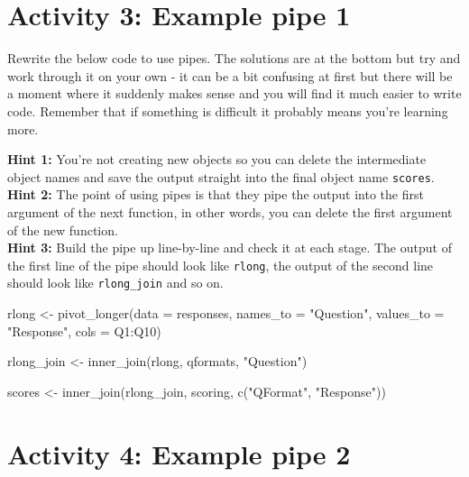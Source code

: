\documentclass[
  oneside]{book}
\newenvironment{Shaded}{\begin{snugshade}}{\end{snugshade}}
\newcommand{\AttributeTok}[1]{\textcolor[rgb]{0.77,0.63,0.00}{#1}}
\newcommand{\FunctionTok}[1]{\textcolor[rgb]{0.00,0.00,0.00}{#1}}
\newcommand{\NormalTok}[1]{#1}
\newcommand{\OtherTok}[1]{\textcolor[rgb]{0.56,0.35,0.01}{#1}}
\newcommand{\SpecialCharTok}[1]{\textcolor[rgb]{0.00,0.00,0.00}{#1}}
\newcommand{\StringTok}[1]{\textcolor[rgb]{0.31,0.60,0.02}{#1}}
\begin{document}
\hypertarget{activity-3-example-pipe-1}{%
\section{Activity 3: Example pipe 1}\label{activity-3-example-pipe-1}}

Rewrite the below code to use pipes. The solutions are at the bottom but try and work through it on your own - it can be a bit confusing at first but there will be a moment where it suddenly makes sense and you will find it much easier to write code. Remember that if something is difficult it probably means you're learning more.

\textbf{Hint 1:} You're not creating new objects so you can delete the intermediate object names and save the output straight into the final object name \texttt{scores}.\\
\textbf{Hint 2:} The point of using pipes is that they pipe the output into the first argument of the next function, in other words, you can delete the first argument of the new function.\\
\textbf{Hint 3:} Build the pipe up line-by-line and check it at each stage. The output of the first line of the pipe should look like \texttt{rlong}, the output of the second line should look like \texttt{rlong\_join} and so on.

\begin{Shaded}
\begin{Highlighting}[]
\NormalTok{rlong }\OtherTok{\textless{}{-}} \FunctionTok{pivot\_longer}\NormalTok{(}\AttributeTok{data =}\NormalTok{ responses, }
                      \AttributeTok{names\_to =} \StringTok{"Question"}\NormalTok{,  }
                      \AttributeTok{values\_to =} \StringTok{"Response"}\NormalTok{,}
                      \AttributeTok{cols =}\NormalTok{ Q1}\SpecialCharTok{:}\NormalTok{Q10)}

\NormalTok{rlong\_join }\OtherTok{\textless{}{-}} \FunctionTok{inner\_join}\NormalTok{(rlong, qformats, }\StringTok{"Question"}\NormalTok{)}

\NormalTok{scores }\OtherTok{\textless{}{-}} \FunctionTok{inner\_join}\NormalTok{(rlong\_join, scoring, }\FunctionTok{c}\NormalTok{(}\StringTok{"QFormat"}\NormalTok{, }\StringTok{"Response"}\NormalTok{))}
\end{Highlighting}
\end{Shaded}

\hypertarget{activity-4-example-pipe-2}{%
\section{Activity 4: Example pipe 2}\label{activity-4-example-pipe-2}}
\end{document}
